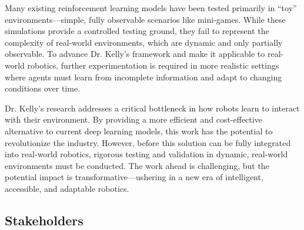 \documentclass{article}
\begin{document}
Many existing reinforcement learning models have been tested primarily in “toy” environments—simple, fully observable scenarios like mini-games. While these simulations provide a controlled testing ground, they fail to represent the complexity of real-world environments, which are dynamic and only partially observable. To advance Dr. Kelly’s framework and make it applicable to real-world robotics, further experimentation is required in more realistic settings where agents must learn from incomplete information and adapt to changing conditions over time.

Dr. Kelly’s research addresses a critical bottleneck in how robots learn to interact with their environment. By providing a more efficient and cost-effective alternative to current deep learning models, this work has the potential to revolutionize the industry. However, before this solution can be fully integrated into real-world robotics, rigorous testing and validation in dynamic, real-world environments must be conducted. The work ahead is challenging, but the potential impact is transformative—ushering in a new era of intelligent, accessible, and adaptable robotics.

\subsection{Stakeholders}
\end{document}
